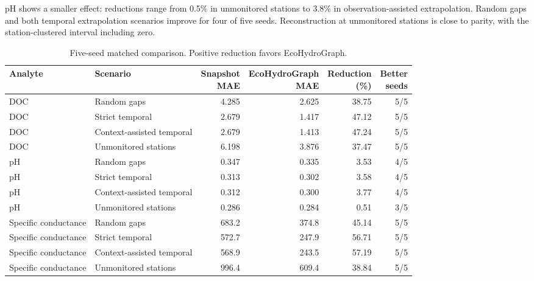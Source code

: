 \documentclass[11pt]{article}
\begin{document}
pH shows a smaller effect: reductions range from 0.5\% in unmonitored stations to 3.8\% in observation-assisted extrapolation. Random gaps and both temporal extrapolation scenarios improve for four of five seeds. Reconstruction at unmonitored stations is close to parity, with the station-clustered interval including zero.

\begin{table}[t]\centering\caption{Five-seed matched comparison. Positive reduction favors EcoHydroGraph.}\label{tab:main}\scriptsize
\setlength{\tabcolsep}{3pt}
\begin{tabular}{lp{2.8cm}rrrr}\toprule
Analyte & Scenario & \shortstack{Snapshot\\MAE} & \shortstack{EcoHydroGraph\\MAE} & \shortstack{Reduction\\(\%)} & \shortstack{Better\\seeds}\\\midrule
DOC&Random gaps&4.285&2.625&38.75&5/5\\
DOC&Strict temporal&2.679&1.417&47.12&5/5\\
DOC&Context-assisted temporal&2.679&1.413&47.24&5/5\\
DOC&Unmonitored stations&6.198&3.876&37.47&5/5\\\midrule
pH&Random gaps&0.347&0.335&3.53&4/5\\
pH&Strict temporal&0.313&0.302&3.58&4/5\\
pH&Context-assisted temporal&0.312&0.300&3.77&4/5\\
pH&Unmonitored stations&0.286&0.284&0.51&3/5\\\midrule
Specific conductance&Random gaps&683.2&374.8&45.14&5/5\\
Specific conductance&Strict temporal&572.7&247.9&56.71&5/5\\
Specific conductance&Context-assisted temporal&568.9&243.5&57.19&5/5\\
Specific conductance&Unmonitored stations&996.4&609.4&38.84&5/5\\\bottomrule
\end{tabular}\end{table}
\end{document}
